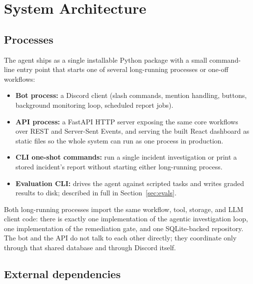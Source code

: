 \documentclass[11pt]{article}
\begin{document}
\section{System Architecture}

\subsection{Processes}

The agent ships as a single installable Python package with a small
command-line entry point that starts one of several long-running processes
or one-off workflows:

\begin{itemize}
  \item \textbf{Bot process:} a Discord client (slash commands, mention
    handling, buttons, background monitoring loop, scheduled report jobs).
  \item \textbf{API process:} a FastAPI HTTP server exposing the same core
    workflows over REST and Server-Sent Events, and serving the built React
    dashboard as static files so the whole system can run as one process in
    production.
  \item \textbf{CLI one-shot commands:} run a single incident investigation
    or print a stored incident's report without starting either long-running
    process.
  \item \textbf{Evaluation CLI:} drives the agent against scripted tasks and
    writes graded results to disk; described in full in Section~\ref{sec:evals}.
\end{itemize}

Both long-running processes import the same workflow, tool, storage, and LLM
client code: there is exactly one implementation of the agentic
investigation loop, one implementation of the remediation gate, and one
SQLite-backed repository. The bot and the API do not talk to each other
directly; they coordinate only through that shared database and through
Discord itself.

\subsection{External dependencies}
\end{document}
